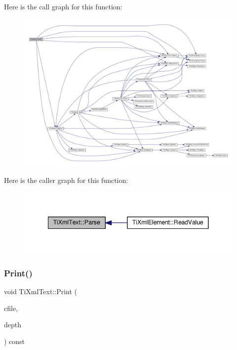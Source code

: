 Here is the call graph for this function\+:
\nopagebreak
\begin{figure}[H]
\begin{center}
\leavevmode
\includegraphics[width=350pt]{class_ti_xml_text_a8d2dcfa41fc73d3e62dacc2fcf633819_cgraph}
\end{center}
\end{figure}
Here is the caller graph for this function\+:
\nopagebreak
\begin{figure}[H]
\begin{center}
\leavevmode
\includegraphics[width=341pt]{class_ti_xml_text_a8d2dcfa41fc73d3e62dacc2fcf633819_icgraph}
\end{center}
\end{figure}
\mbox{\label{class_ti_xml_text_a75f6895906333894e2574cc8cf77ea79}} 
\subsubsection{\texorpdfstring{Print()}{Print()}}
{\footnotesize\ttfamily void Ti\+Xml\+Text\+::\+Print (\begin{DoxyParamCaption}\item[{F\+I\+LE $\ast$}]{cfile,  }\item[{int}]{depth }\end{DoxyParamCaption}) const\hspace{0.3cm}{\ttfamily [virtual]}}

